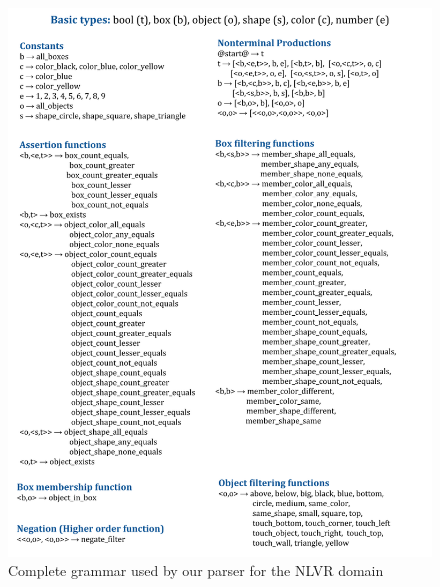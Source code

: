 \begin{figure}
	\includegraphics[width=\textwidth]{figures/nlvr_grammar.png}
	\caption{Complete grammar used by our parser for the NLVR
	domain}\label{fig:nlvr_grammar}
\end{figure}

